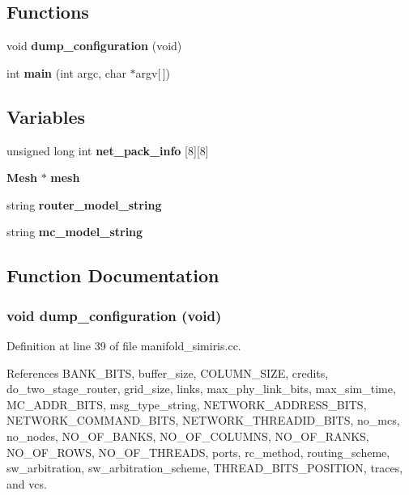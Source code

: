 \subsection*{Functions}
\begin{CompactItemize}
\item 
void {\bf dump\_\-configuration} (void)
\item 
int {\bf main} (int argc, char $\ast$argv[$\,$])
\end{CompactItemize}
\subsection*{Variables}
\begin{CompactItemize}
\item 
unsigned long int {\bf net\_\-pack\_\-info} [8][8]
\item 
{\bf Mesh} $\ast$ {\bf mesh}
\item 
string {\bf router\_\-model\_\-string}
\item 
string {\bf mc\_\-model\_\-string}
\end{CompactItemize}


\subsection{Function Documentation}
\subsubsection[{dump\_\-configuration}]{\setlength{\rightskip}{0pt plus 5cm}void dump\_\-configuration (void)}\label{manifold__simiris_8cc_ba4b9ebf0f24b6a5bd293a6b7c6a54dc}




Definition at line 39 of file manifold\_\-simiris.cc.

References BANK\_\-BITS, buffer\_\-size, COLUMN\_\-SIZE, credits, do\_\-two\_\-stage\_\-router, grid\_\-size, links, max\_\-phy\_\-link\_\-bits, max\_\-sim\_\-time, MC\_\-ADDR\_\-BITS, msg\_\-type\_\-string, NETWORK\_\-ADDRESS\_\-BITS, NETWORK\_\-COMMAND\_\-BITS, NETWORK\_\-THREADID\_\-BITS, no\_\-mcs, no\_\-nodes, NO\_\-OF\_\-BANKS, NO\_\-OF\_\-COLUMNS, NO\_\-OF\_\-RANKS, NO\_\-OF\_\-ROWS, NO\_\-OF\_\-THREADS, ports, rc\_\-method, routing\_\-scheme, sw\_\-arbitration, sw\_\-arbitration\_\-scheme, THREAD\_\-BITS\_\-POSITION, traces, and vcs.

